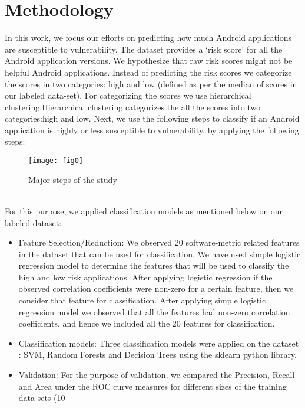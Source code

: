 \documentclass[11pt]{article} %
\begin{document}
\section{Methodology}
In this work, we focus our efforts on predicting how much Android applications are  susceptible to vulnerability. The dataset provides a ‘risk score’ for all the Android application versions. We hypothesize that raw risk scores might not be helpful Android applications. Instead of predicting the risk scores we categorize the scores in two categories: high and low (defined as per the median of scores in our labeled data-set). For categorizing the scores we use hierarchical clustering.Hierarchical clustering categorizes the all the scores into two categories:high and low. Next, we use the following steps to classify if an Android application is highly or less susceptible to vulnerability, by applying the following steps:
\begin{figure}[h!]
    \centering
    \texttt{[image: fig0]}
    \caption{Major steps of the study}
    \label{fig0}
\end{figure}
\\For this purpose, we applied classification models as mentioned below on our labeled dataset:
\begin{itemize}
    \item Feature Selection/Reduction:  We observed 20 software-metric related features in the dataset that can be used for classification. We have used simple logistic regression model to determine the features that will be used to classify the high and low risk applications. After applying logistic regression if the observed correlation coefficients were non-zero for a certain feature, then we consider that feature for classification. After applying simple logistic regression model we observed that all the features had non-zero correlation coefficients, and hence we included all the 20 features for classification.    
    \item Classification models: Three classification models were applied on the dataset : SVM, Random Forests and Decision Trees using the sklearn python library.
    \item Validation: For the purpose of validation, we compared the Precision, Recall and Area under the ROC curve measures for different sizes of the training data sets (10%
\end{itemize}
\end{document}
